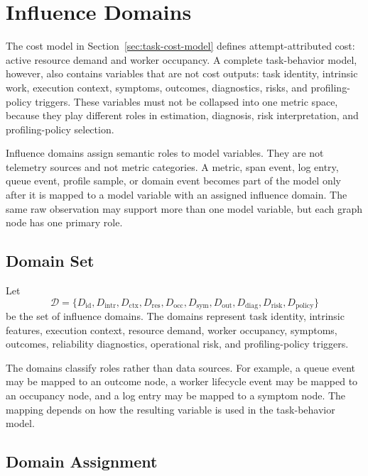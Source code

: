 \section{Influence Domains}
\label{sec:influence-domains}

The cost model in Section~\ref{sec:task-cost-model} defines attempt-attributed
cost: active resource demand and worker occupancy. A complete task-behavior
model, however, also contains variables that are not cost outputs: task
identity, intrinsic work, execution context, symptoms, outcomes, diagnostics,
risks, and profiling-policy triggers. These variables must not be collapsed into
one metric space, because they play different roles in estimation, diagnosis,
risk interpretation, and profiling-policy selection.

Influence domains assign semantic roles to model variables. They are not
telemetry sources and not metric categories. A metric, span event, log entry,
queue event, profile sample, or domain event becomes part of the model only
after it is mapped to a model variable with an assigned influence domain. The
same raw observation may support more than one model variable, but each graph
node has one primary role.

\subsection{Domain Set}
\label{sec:influence-domain-set}

Let
\[
\mathcal{D}
=
\{
D_{\mathrm{id}},
D_{\mathrm{intr}},
D_{\mathrm{ctx}},
D_{\mathrm{res}},
D_{\mathrm{occ}},
D_{\mathrm{sym}},
D_{\mathrm{out}},
D_{\mathrm{diag}},
D_{\mathrm{risk}},
D_{\mathrm{policy}}
\}
\]
be the set of influence domains. The domains represent task identity, intrinsic
features, execution context, resource demand, worker occupancy, symptoms,
outcomes, reliability diagnostics, operational risk, and profiling-policy
triggers.

The domains classify roles rather than data sources. For example, a queue event
may be mapped to an outcome node, a worker lifecycle event may be mapped to an
occupancy node, and a log entry may be mapped to a symptom node. The mapping
depends on how the resulting variable is used in the task-behavior model.

\subsection{Domain Assignment}
\label{sec:influence-domain-assignment}


